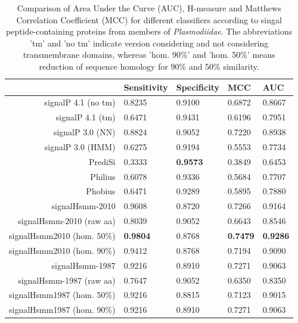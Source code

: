 \documentclass[10pt,letterpaper]{article}
\begin{document}
\begin{table}[ht]
\centering
\caption{Comparison of Area Under the Curve (AUC), H-measure and Matthews Correlation Coefficient (MCC) for different classifiers according to singal peptide-containing proteins from members of \textit{Plasmodiidae}. The abbreviations 'tm' and 'no tm' indicate version considering and not considering transmembrane domains, whereas 'hom. 90\%' and 'hom. 50\%' means reduction of sequence homology for 90\% and 50\% similarity.} 
\label{tab:bench2010plas}
\begin{tabular}{rllll}
  \toprule
 & Sensitivity & Specificity & MCC & AUC \\ 
  \midrule
signalP 4.1 (no tm) \cite{2011petersensignalp} & 0.8235 & 0.9100 & 0.6872 & 0.8667 \\ 
   \rowcolor[gray]{0.85}signalP 4.1 (tm) \cite{2011petersensignalp} & 0.6471 & 0.9431 & 0.6196 & 0.7951 \\ 
  signalP 3.0 (NN) \cite{2004bendtsenimproved} & 0.8824 & 0.9052 & 0.7220 & 0.8938 \\ 
   \rowcolor[gray]{0.85}signalP 3.0 (HMM) \cite{2004bendtsenimproved} & 0.6275 & 0.9194 & 0.5553 & 0.7734 \\ 
  PrediSi \cite{2004hillerpredisi} & 0.3333 & \textbf{0.9573} & 0.3849 & 0.6453 \\ 
   \rowcolor[gray]{0.85}Philius \cite{2008reynoldstransmembrane} & 0.6078 & 0.9336 & 0.5684 & 0.7707 \\ 
  Phobius \cite{2004klla} & 0.6471 & 0.9289 & 0.5895 & 0.7880 \\ 
   \rowcolor[gray]{0.85}signalHsmm-2010 & 0.9608 & 0.8720 & 0.7266 & 0.9164 \\ 
  signalHsmm-2010 (raw aa) & 0.8039 & 0.9052 & 0.6643 & 0.8546 \\ 
   \rowcolor[gray]{0.85}signalHsmm2010 (hom. 50\%) & \textbf{0.9804} & 0.8768 & \textbf{0.7479} & \textbf{0.9286} \\ 
  signalHsmm2010 (hom. 90\%) & 0.9412 & 0.8768 & 0.7194 & 0.9090 \\ 
   \rowcolor[gray]{0.85}signalHsmm-1987 & 0.9216 & 0.8910 & 0.7271 & 0.9063 \\ 
  signalHsmm-1987 (raw aa) & 0.7647 & 0.9052 & 0.6350 & 0.8350 \\ 
   \rowcolor[gray]{0.85}signalHsmm1987 (hom. 50\%) & 0.9216 & 0.8815 & 0.7123 & 0.9015 \\ 
  signalHsmm1987 (hom. 90\%) & 0.9216 & 0.8910 & 0.7271 & 0.9063 \\ 
   \bottomrule
\end{tabular}
\end{table}
\end{document}
